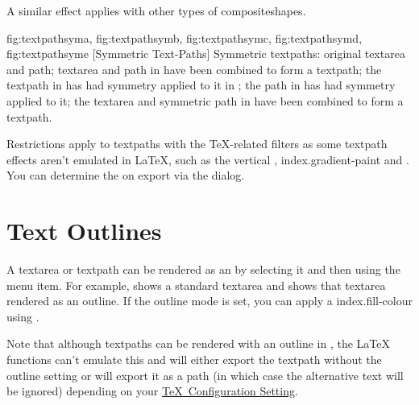 A similar effect applies with other types of \glspl{compositeshape}.

{%
 {fig:textpathsyma}{}{},
 {fig:textpathsymb}{}{},
 {fig:textpathsymc}{}{},
 {fig:textpathsymd}{}{},
 {fig:textpathsyme}{}{}
}
[Symmetric Text-Paths]
{Symmetric \glspl{textpath}:
 original \gls{textarea} and \gls{path};
 \gls{textarea} and \gls{path} in 
 have been combined to
form a \gls{textpath};
 the \gls{textpath} in  
has had \gls{symmetry} applied to it in \editpathmode; 
 the \gls{path} in
 has had \gls{symmetry} applied to it;
 the \gls{textarea} and symmetric path in 
 have been combined to form a
\gls{textpath}.}

\begin{warning}
Restrictions apply to \glspl*{textpath} with the
 \TeX-related filters as some \gls*{textpath}
effects aren't emulated in \LaTeX, such as the vertical ,
\gls{index.gradient-paint} and . You can determine 
the  on export via the  dialog.
\end{warning}


\section{Text Outlines}\label{sec:textoutline}


A \gls{textarea} or \gls{textpath} can be rendered as an
 by
selecting it and then using the 
menu item. For example,  shows a
standard \gls*{textarea} and  shows
that \gls*{textarea} rendered as an outline. If the outline mode is
set, you can apply a \gls{index.fill-colour} using
.

\begin{warning}
Note that although \glspl*{textpath} can be rendered with an outline in \FlowframTk,
the \LaTeX\  functions can't emulate
this and will either export the \gls*{textpath} without the outline
setting or will export it as a path (in which case the alternative
text will be ignored) depending on your
\hyperref[sec:texconfig]{\TeX\ Configuration Setting}.
\end{warning}

